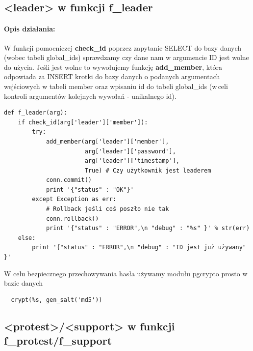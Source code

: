 \documentclass{article}
\begin{document}
\newpage
\subsection{<leader> w funkcji f\_leader}
\paragraph{Opis działania: }
W funkcji pomocniczej \textbf{check\_id} poprzez zapytanie SELECT do bazy danych (wobec tabeli global\_ids) sprawdzamy czy dane nam w argumencie ID jest wolne do użycia.
Jeśli jest wolne to wywołujemy funkcję \textbf{add\_member}, która odpowiada za INSERT krotki do bazy danych o podanych argumentach wejściowych w tabeli member oraz wpisaniu id do tabeli global\_ids 
(w\,celi kontroli argumentów kolejnych wywołań - unikalnego id).
\begin{verbatim}
def f_leader(arg):
    if check_id(arg['leader']['member']): 
        try:
            add_member(arg['leader']['member'],
                       arg['leader']['password'],
                       arg['leader']['timestamp'], 
                       True) # Czy użytkownik jest leaderem
            conn.commit()
            print '{"status" : "OK"}'
        except Exception as err:
            # Rollback jeśli coś poszło nie tak
            conn.rollback()
            print '{"status" : "ERROR",\n "debug" : "%s" }' % str(err)
    else: 
        print '{"status" : "ERROR",\n "debug" : "ID jest już używany" }'   
\end{verbatim}

W celu bezpiecznego przechowywania hasła używamy modułu pgcrypto prosto w bazie danych
\begin{verbatim}
  crypt(%s, gen_salt('md5'))
\end{verbatim}







\newpage
\subsection{<protest>/<support> w funkcji f\_protest/f\_support}
\end{document}
